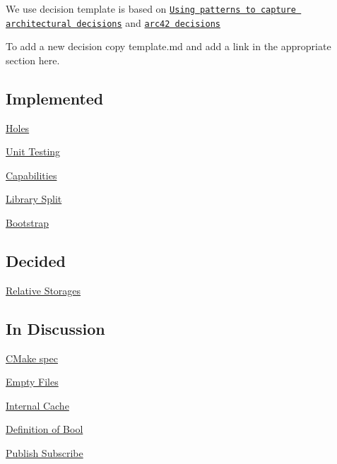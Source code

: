 We use decision template is based on \href{http://www.cs.rug.nl/~paris/papers/IEEESW07.pdf}{\tt Using patterns to capture architectural decisions} and \href{http://confluence.arc42.org/display/templateEN/9.+Design+Decisions}{\tt arc42 decisions}

To add a new decision copy template.\+md and add a link in the appropriate section here.

\subsection*{Implemented}


\begin{DoxyItemize}
\item \hyperlink{doc_decisions_holes_md}{Holes}
\item \hyperlink{doc_decisions_unit_testing_md}{Unit Testing}
\item \hyperlink{doc_decisions_capabilities_md}{Capabilities}
\item \hyperlink{doc_decisions_library_split_md}{Library Split}
\item \hyperlink{doc_decisions_bootstrap_md}{Bootstrap}
\end{DoxyItemize}

\subsection*{Decided}


\begin{DoxyItemize}
\item \hyperlink{doc_decisions_relative_md}{Relative Storages}
\end{DoxyItemize}

\subsection*{In Discussion}


\begin{DoxyItemize}
\item \hyperlink{doc_decisions_cmake_spec_md}{C\+Make spec}
\item \hyperlink{doc_decisions_empty_files_md}{Empty Files}
\item \hyperlink{doc_decisions_internal_cache_md}{Internal Cache}
\item \hyperlink{doc_decisions_bool_md}{Definition of Bool}
\item \hyperlink{doc_decisions_pubsub_md}{Publish Subscribe}
\end{DoxyItemize}

